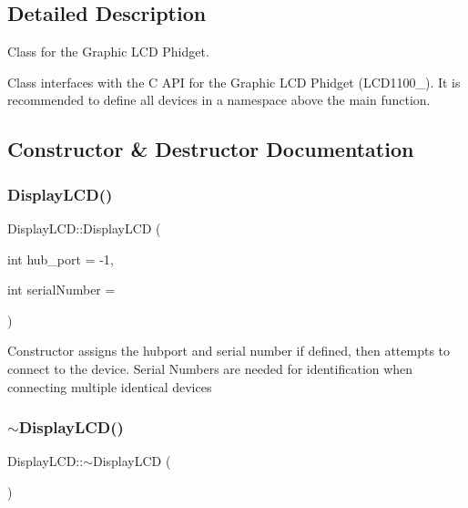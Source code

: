 \subsection{Detailed Description}
Class for the Graphic L\+CD Phidget. 

Class interfaces with the C A\+PI for the Graphic L\+CD Phidget (L\+C\+D1100\+\_). It is recommended to define all devices in a namespace above the main function. 

\subsection{Constructor \& Destructor Documentation}
\mbox{\label{classDisplayLCD_a04f74ffd3ac0f9499ae3d8941ed27f9c}} 
\subsubsection{\texorpdfstring{Display\+L\+C\+D()}{DisplayLCD()}}
{\footnotesize\ttfamily Display\+L\+C\+D\+::\+Display\+L\+CD (\begin{DoxyParamCaption}\item[{int}]{hub\+\_\+port = {\ttfamily -\/1},  }\item[{int}]{serial\+Number = {} }\end{DoxyParamCaption})\hspace{0.3cm}{\ttfamily [inline]}}

Constructor assigns the hubport and serial number if defined, then attempts to connect to the device. Serial Numbers are needed for identification when connecting multiple identical devices\mbox{\label{classDisplayLCD_ac6ed1397321b6faae3bfb2b24bed8035}} 
\subsubsection{\texorpdfstring{$\sim$\+Display\+L\+C\+D()}{~DisplayLCD()}}
{\footnotesize\ttfamily Display\+L\+C\+D\+::$\sim$\+Display\+L\+CD (\begin{DoxyParamCaption}{ }\end{DoxyParamCaption})\hspace{0.3cm}{\ttfamily [inline]}}

